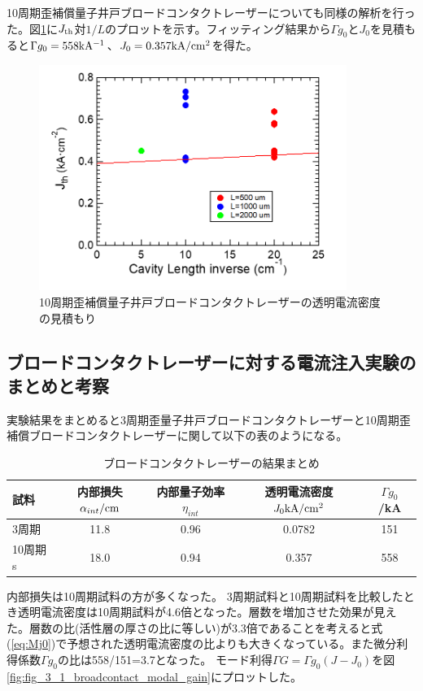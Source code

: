 {{10周期歪補償量子井戸ブロードコンタクトレーザーについても同様の解析を行った。図\ref{fig:fig_3_1_10QW_broadcontact_j0}に$J_{\rm{th}}$対$1/L$のプロットを示す。フィッティング結果から$\Gamma g_{0}$と$J_{0}$を見積もると$\Gamma g_{0}=558   \rm{kA^{-1}}$、$J_{0}=0.357 \rm{kA/cm^{2}}$を得た。
\begin{figure}[t]
	\centering
	\includegraphics[width=10cm]{figure/fig_3_1_10QW_broadcontact_j0.png}
	\caption{10周期歪補償量子井戸ブロードコンタクトレーザーの透明電流密度の見積もり}
	\label{fig:fig_3_1_10QW_broadcontact_j0}
\end{figure}
\newpage
\subsection{ブロードコンタクトレーザーに対する電流注入実験のまとめと考察}

実験結果をまとめると3周期歪量子井戸ブロードコンタクトレーザーと10周期歪補償ブロードコンタクトレーザーに関して以下の表のようになる。
\begin{table}[h]
  \caption{ブロードコンタクトレーザーの結果まとめ}
  \label{table:table_I0}
  \centering
  \begin{tabular}{lcccc}
    \hline
    試料   &  内部損失$\alpha_{int} \rm{ /cm}$&内部量子効率$\eta_{int} $&透明電流密度 $J_{0} \rm{  kA/cm^2}$  &$\Gamma g_{0}$ /kA\\
    \hline \hline
     3周期 &   11.8 &0.96&0.0782 & 151\\
    10周期s  & 18.0 &0.94&0.357&558\\
    \hline
  \end{tabular}
\end{table}

内部損失は10周期試料の方が多くなった。
3周期試料と10周期試料を比較したとき透明電流密度は10周期試料が4.6倍となった。層数を増加させた効果が見えた。層数の比(活性層の厚さの比に等しい)が3.3倍であることを考えると式(\ref{eq:Mj0})で予想された透明電流密度の比よりも大きくなっている。また微分利得係数$\Gamma g_{0}$の比は558/151=3.7となった。
モード利得$\Gamma G=\Gamma g_{0}(J-J_{0})$を図\ref{fig:fig_3_1_broadcontact_modal_gain}にプロットした。

}}
